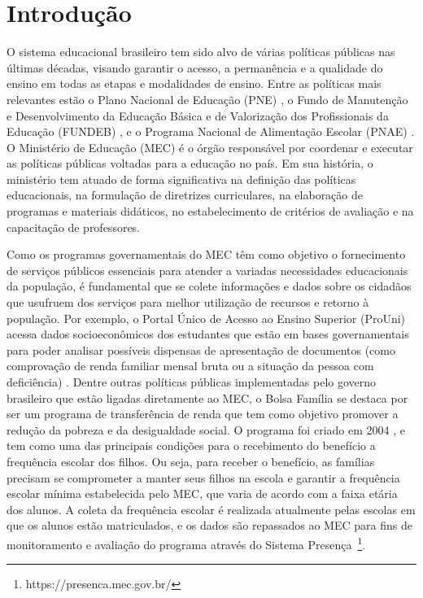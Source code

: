 \chapter{Introdução}

O sistema educacional brasileiro tem sido alvo de várias políticas públicas nas últimas décadas, visando garantir o acesso, a permanência e a qualidade do ensino em todas as etapas e modalidades de ensino. Entre as políticas mais relevantes estão o Plano Nacional de Educação (PNE) \cite{PNE:2001}, o Fundo de Manutenção e Desenvolvimento da Educação Básica e de Valorização dos Profissionais da Educação (FUNDEB) \cite{FUNDEB:2020}, e o Programa Nacional de Alimentação Escolar (PNAE) \cite{PNAE:2009}. O Ministério de Educação (MEC) é o órgão responsável por coordenar e executar as políticas públicas voltadas para a educação no país. Em sua história, o ministério tem atuado de forma significativa na definição das políticas educacionais, na formulação de diretrizes curriculares, na elaboração de programas e materiais didáticos, no estabelecimento de critérios de avaliação e na capacitação de professores.

Como os programas governamentais do MEC têm como objetivo o fornecimento de serviços públicos essenciais para atender a variadas necessidades educacionais da população, é fundamental que se colete informações e dados sobre os cidadãos que usufruem dos serviços para melhor utilização de recursos e retorno à população. Por exemplo, o  Portal Único de Acesso ao Ensino Superior (ProUni) acessa dados socioeconômicos dos estudantes que estão em bases governamentais para poder analisar possíveis dispensas de apresentação de documentos (como comprovação de renda familiar mensal bruta ou a situação da pessoa com deficiência) \cite{PROUni:2005}. Dentre outras políticas públicas implementadas pelo governo brasileiro que estão ligadas diretamente ao MEC, o Bolsa Família \cite{BolsaFamilia2023} se destaca por ser um programa de transferência de renda que tem como objetivo promover a redução da pobreza e da desigualdade social. O programa foi criado em 2004 \cite{BolsaFamilia}, e tem como uma das principais condições para o recebimento do benefício a frequência escolar dos filhos. Ou seja, para receber o benefício, as famílias precisam se comprometer a manter seus filhos na escola e garantir a frequência escolar mínima estabelecida pelo MEC, que varia de acordo com a faixa etária dos alunos. A coleta da frequência escolar é realizada atualmente pelas escolas em que os alunos estão matriculados, e os dados são repassados ao MEC para fins de monitoramento e avaliação do programa através do Sistema Presença~\footnote{https://presenca.mec.gov.br/}. 

